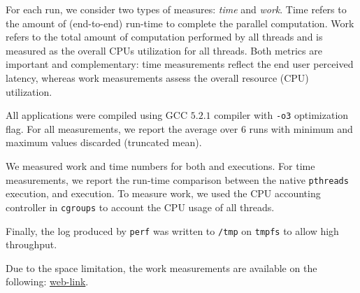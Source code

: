   For each run, we consider two types of measures: \emph{time} and
 {\em work}.  Time refers to the amount of (end-to-end)
run-time to complete the parallel computation.  Work refers to the total amount of
computation performed by all threads and is measured as the overall CPUs utilization for all threads. 
Both metrics are important
and complementary: time measurements reflect the end user perceived latency,
whereas work measurements assess the overall resource (CPU) utilization.


 All applications were compiled using
GCC $5.2.1$ compiler with {\tt -o3} optimization flag. For all
measurements, we report the average over $6$ runs with minimum and maximum values
discarded (truncated mean).

 We measured work and time numbers for both \pthreads and \projecttitle executions. For time measurements, we report the run-time comparison between the native {\tt pthreads} execution, and \projecttitle execution.   To measure work, we used the CPU accounting controller in {\tt cgroups} to account the CPU usage of all threads. 

Finally, the log produced by
{\tt perf} was written to {\tt /tmp} on {\tt tmpfs} to allow high throughput.


   Due to the space limitation, the work measurements are available on the following: \href{https://mic92.github.io/inspector/index.html}{web-link}.




